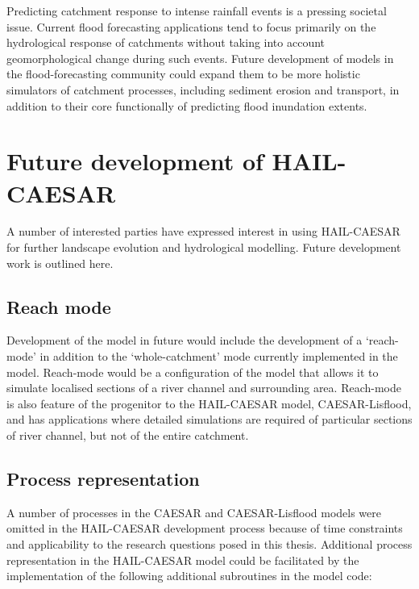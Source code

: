 Predicting catchment response to intense rainfall events is a pressing societal issue. Current flood forecasting applications tend to focus primarily on the hydrological response of catchments without taking into account geomorphological change during such events. Future development of models in the flood-forecasting community could expand them to be more holistic simulators of catchment processes, including sediment erosion and transport, in addition to their core functionally of predicting flood inundation extents. 

\section{Future development of HAIL-CAESAR}

A number of interested parties have expressed interest in using HAIL-CAESAR for further landscape evolution and hydrological modelling. Future development work is outlined here.

\subsection*{Reach mode}
Development of the model in future would include the development of a `reach-mode' in addition to the `whole-catchment' mode currently implemented in the model. Reach-mode would be a configuration of the model that allows it to simulate localised sections of a river channel and surrounding area. Reach-mode is also feature of the progenitor to the HAIL-CAESAR model, CAESAR-Lisflood, and has applications where detailed simulations are required of particular sections of river channel, but not of the entire catchment.

\subsection*{Process representation}
A number of processes in the CAESAR and CAESAR-Lisflood models were omitted in the HAIL-CAESAR development process because of time constraints and applicability to the research questions posed in this thesis. Additional process representation in the HAIL-CAESAR model could be facilitated by the implementation of the following additional subroutines in the model code:

